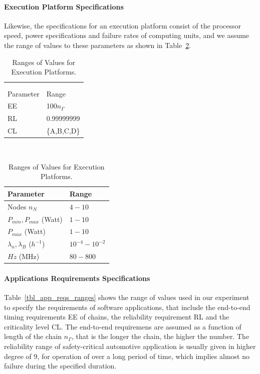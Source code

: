 \paragraph{Execution Platform Specifications}
Likewise, the specifications for an execution platform consist of the processor speed, power specifications and failure rates of computing units, and we assume the range of values to these parameters as shown in Table~\ref{tbl_execpla}.
\begin{table}
	\small
	\parbox{.4\linewidth}{
		\centering
		\begin{tabular}{@{}ll@{}}
			&\\&\\
			\toprule
			Parameter  			& Range\\ 
			\midrule
			EE					 	& 100$n_\Gamma$\\
			RL 						& 0.99999999\\
			CL 						& \{A,B,C,D\}\\
			\bottomrule
		\end{tabular}
		\caption{Ranges of Values for Applications Requirements.}
		\label{tbl_app_reqs_ranges}
	}
~
	\parbox{.5\linewidth}{
		\centering\raggedbottom
		\begin{tabular}{@{}ll@{}}
			\toprule
			Parameter  		& Range\\ 
			\midrule
			Nodes $n_N$							& $4-10$\\
			$P_{min},P_{max}$ (Watt)	& $1-10$\\
			$P_{max}$ (Watt)	& $1-10$\\
			$\lambda_n,\lambda_B$ ($h^{-1}$) 	& $10^{-4}-10^{-2}$\\
			$Hz$ (MHz)			 	& $80-800$\\
			\bottomrule
		\end{tabular}
		\caption{Ranges of Values for Execution Platforms.}
		\label{tbl_execpla}
	}
\end{table}

\paragraph{Applications Requirements Specifications } Table~\ref{tbl_app_reqs_ranges}  shows the range of values used in our experiment to specify the requirements of software applications, that include the end-to-end timing requirements EE of chains, the reliability requirement RL and the criticality level CL. The end-to-end requiremens are assumed as a function of length of the chain $n_\Gamma$, that is the longer the chain, the higher the number. The reliability range of safety-critical automotive application is usually given in higher degree of 9, for operation of over a long period of time, which implies almost no failure during the specified duration.


